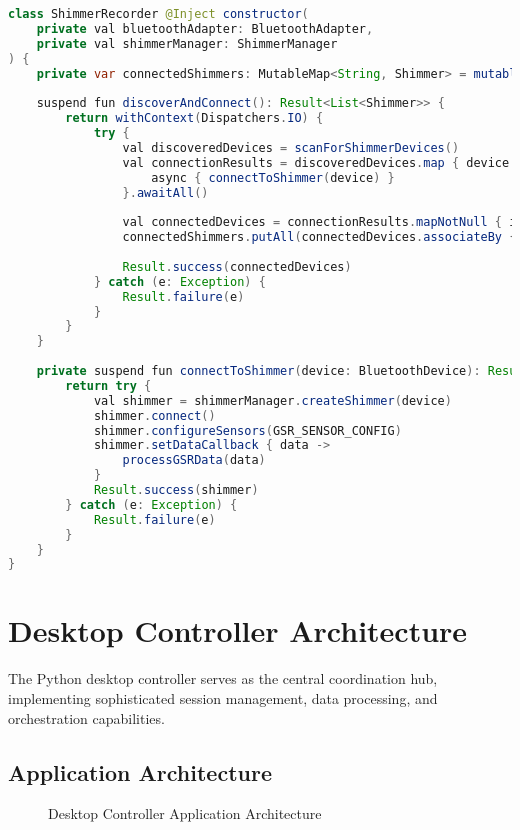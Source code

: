 \documentclass[11pt,a4paper]{report}
\begin{document}
\begin{lstlisting}[language=Java]
class ShimmerRecorder @Inject constructor(
    private val bluetoothAdapter: BluetoothAdapter,
    private val shimmerManager: ShimmerManager
) {
    private var connectedShimmers: MutableMap<String, Shimmer> = mutableMapOf()
    
    suspend fun discoverAndConnect(): Result<List<Shimmer>> {
        return withContext(Dispatchers.IO) {
            try {
                val discoveredDevices = scanForShimmerDevices()
                val connectionResults = discoveredDevices.map { device ->
                    async { connectToShimmer(device) }
                }.awaitAll()
                
                val connectedDevices = connectionResults.mapNotNull { it.getOrNull() }
                connectedShimmers.putAll(connectedDevices.associateBy { it.macAddress })
                
                Result.success(connectedDevices)
            } catch (e: Exception) {
                Result.failure(e)
            }
        }
    }
    
    private suspend fun connectToShimmer(device: BluetoothDevice): Result<Shimmer> {
        return try {
            val shimmer = shimmerManager.createShimmer(device)
            shimmer.connect()
            shimmer.configureSensors(GSR_SENSOR_CONFIG)
            shimmer.setDataCallback { data ->
                processGSRData(data)
            }
            Result.success(shimmer)
        } catch (e: Exception) {
            Result.failure(e)
        }
    }
}
\end{lstlisting}

\section{Desktop Controller Architecture}

The Python desktop controller serves as the central coordination hub, implementing sophisticated session management, data processing, and orchestration capabilities.

\subsection{Application Architecture}

\begin{figure}[ht]
\centering
\framebox[0.9\textwidth][c]{\rule{0pt}{4cm}}
\caption{Desktop Controller Application Architecture}
\label{fig:desktop-architecture}
\end{figure}
\end{document}
